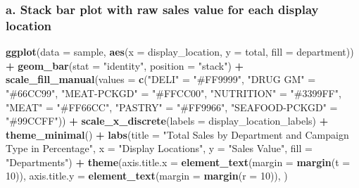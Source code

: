 \documentclass[
]{article}
\newenvironment{Shaded}{\begin{snugshade}}{\end{snugshade}}
\newcommand{\AttributeTok}[1]{\textcolor[rgb]{0.13,0.29,0.53}{#1}}
\newcommand{\DecValTok}[1]{\textcolor[rgb]{0.00,0.00,0.81}{#1}}
\newcommand{\FunctionTok}[1]{\textcolor[rgb]{0.13,0.29,0.53}{\textbf{#1}}}
\newcommand{\NormalTok}[1]{#1}
\newcommand{\OtherTok}[1]{\textcolor[rgb]{0.56,0.35,0.01}{#1}}
\newcommand{\SpecialCharTok}[1]{\textcolor[rgb]{0.81,0.36,0.00}{\textbf{#1}}}
\newcommand{\StringTok}[1]{\textcolor[rgb]{0.31,0.60,0.02}{#1}}
\begin{document}
\hypertarget{a.-stack-bar-plot-with-raw-sales-value-for-each-display-location}{%
\subsubsection{a. Stack bar plot with raw sales value for each display
location}\label{a.-stack-bar-plot-with-raw-sales-value-for-each-display-location}}

\begin{Shaded}
\begin{Highlighting}[]
\FunctionTok{ggplot}\NormalTok{(}\AttributeTok{data =}\NormalTok{ sample, }\FunctionTok{aes}\NormalTok{(}\AttributeTok{x =}\NormalTok{ display\_location, }\AttributeTok{y =}\NormalTok{ total, }\AttributeTok{fill =}\NormalTok{ department)) }\SpecialCharTok{+} 
  \FunctionTok{geom\_bar}\NormalTok{(}\AttributeTok{stat =} \StringTok{"identity"}\NormalTok{, }\AttributeTok{position =} \StringTok{"stack"}\NormalTok{) }\SpecialCharTok{+}
  \FunctionTok{scale\_fill\_manual}\NormalTok{(}\AttributeTok{values =} \FunctionTok{c}\NormalTok{(}\StringTok{"DELI"} \OtherTok{=} \StringTok{"\#FF9999"}\NormalTok{, }
                               \StringTok{"DRUG GM"} \OtherTok{=} \StringTok{"\#66CC99"}\NormalTok{, }
                               \StringTok{"MEAT{-}PCKGD"} \OtherTok{=} \StringTok{"\#FFCC00"}\NormalTok{, }
                               \StringTok{"NUTRITION"} \OtherTok{=} \StringTok{"\#3399FF"}\NormalTok{, }
                               \StringTok{"MEAT"} \OtherTok{=} \StringTok{"\#FF66CC"}\NormalTok{, }
                               \StringTok{"PASTRY"} \OtherTok{=} \StringTok{"\#FF9966"}\NormalTok{, }
                               \StringTok{"SEAFOOD{-}PCKGD"} \OtherTok{=} \StringTok{"\#99CCFF"}\NormalTok{)) }\SpecialCharTok{+}
  \FunctionTok{scale\_x\_discrete}\NormalTok{(}\AttributeTok{labels =}\NormalTok{ display\_location\_labels) }\SpecialCharTok{+}
  \FunctionTok{theme\_minimal}\NormalTok{() }\SpecialCharTok{+}
  \FunctionTok{labs}\NormalTok{(}\AttributeTok{title =} \StringTok{"Total Sales by Department and Campaign Type in Percentage"}\NormalTok{,}
       \AttributeTok{x =} \StringTok{"Display Locations"}\NormalTok{,}
       \AttributeTok{y =} \StringTok{"Sales Value"}\NormalTok{,}
       \AttributeTok{fill =} \StringTok{"Departments"}\NormalTok{) }\SpecialCharTok{+}
  \FunctionTok{theme}\NormalTok{(}\AttributeTok{axis.title.x =} \FunctionTok{element\_text}\NormalTok{(}\AttributeTok{margin =} \FunctionTok{margin}\NormalTok{(}\AttributeTok{t =} \DecValTok{10}\NormalTok{)),}
        \AttributeTok{axis.title.y =} \FunctionTok{element\_text}\NormalTok{(}\AttributeTok{margin =} \FunctionTok{margin}\NormalTok{(}\AttributeTok{r =} \DecValTok{10}\NormalTok{)),}
\NormalTok{)}
\end{Highlighting}
\end{Shaded}
\end{document}
